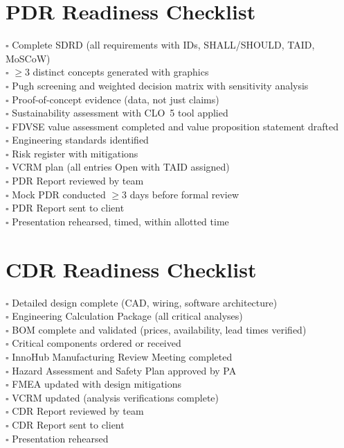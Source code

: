 \section*{PDR Readiness Checklist}
$\square$ Complete SDRD (all requirements with IDs, SHALL/SHOULD, TAID, MoSCoW) \\
$\square$ $\geq$3 distinct concepts generated with graphics \\
$\square$ Pugh screening and weighted decision matrix with sensitivity analysis \\
$\square$ Proof-of-concept evidence (data, not just claims) \\
$\square$ Sustainability assessment with CLO~5 tool applied \\
$\square$ FDVSE value assessment completed and value proposition statement drafted \\
$\square$ Engineering standards identified \\
$\square$ Risk register with mitigations \\
$\square$ VCRM plan (all entries Open with TAID assigned) \\
$\square$ PDR Report reviewed by team \\
$\square$ Mock PDR conducted $\geq$3 days before formal review \\
$\square$ PDR Report sent to client \\
$\square$ Presentation rehearsed, timed, within allotted time

\section*{CDR Readiness Checklist}
$\square$ Detailed design complete (CAD, wiring, software architecture) \\
$\square$ Engineering Calculation Package (all critical analyses) \\
$\square$ BOM complete and validated (prices, availability, lead times verified) \\
$\square$ Critical components ordered or received \\
$\square$ InnoHub Manufacturing Review Meeting completed \\
$\square$ Hazard Assessment and Safety Plan approved by PA \\
$\square$ FMEA updated with design mitigations \\
$\square$ VCRM updated (analysis verifications complete) \\
$\square$ CDR Report reviewed by team \\
$\square$ CDR Report sent to client \\
$\square$ Presentation rehearsed

